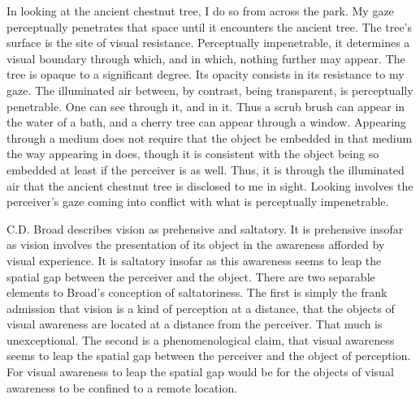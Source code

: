\documentclass[12pt]{article}
\begin{document}

In looking at the ancient chestnut tree, I do so from across the park. My gaze perceptually penetrates that space until it encounters the ancient tree. The tree's surface is the site of visual resistance. Perceptually impenetrable, it determines a visual boundary through which, and in which, nothing further may appear. The tree is opaque to a significant degree. Its opacity consists in its resistance to my gaze. The illuminated air between, by contrast, being transparent, is perceptually penetrable. One can see through it, and in it. Thus a scrub brush can appear in the water of a bath, and a cherry tree can appear through a window. Appearing through a medium does not require that the object be embedded in that medium the way appearing in does, though it is consistent with the object being so embedded at least if the perceiver is as well. Thus, it is through the illuminated air that the ancient chestnut tree is disclosed to me in sight. Looking involves the perceiver's gaze coming into conflict with what is perceptually impenetrable. 

C.D. Broad describes vision as prehensive and saltatory. It is prehensive insofar as vision involves the presentation of its object in the awareness afforded by visual experience. It is saltatory insofar as this awareness seems to leap the spatial gap between the perceiver and the object. There are two separable elements to Broad's conception of saltatoriness. The first is simply the frank admission that vision is a kind of perception at a distance, that the objects of visual awareness are located at a distance from the perceiver. That much is unexceptional. The second is a phenomenological claim, that visual awareness seems to leap the spatial gap between the perceiver and the object of perception. For visual awareness to leap the spatial gap would be for the objects of visual awareness to be confined to a remote location.
\end{document}
